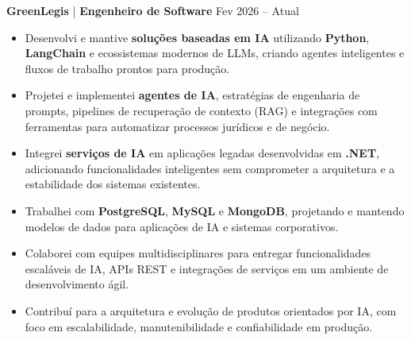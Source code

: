 \textbf{GreenLegis} | \textbf{Engenheiro de Software} \hfill Fev 2026 – Atual
\vspace{-3mm}
\begin{itemize} \itemsep -3pt
    \item Desenvolvi e mantive \textbf{soluções baseadas em IA} utilizando \textbf{Python}, \textbf{LangChain} e ecossistemas modernos de LLMs, criando agentes inteligentes e fluxos de trabalho prontos para produção.
    \item Projetei e implementei \textbf{agentes de IA}, estratégias de engenharia de prompts, pipelines de recuperação de contexto (RAG) e integrações com ferramentas para automatizar processos jurídicos e de negócio.
    \item Integrei \textbf{serviços de IA} em aplicações legadas desenvolvidas em \textbf{.NET}, adicionando funcionalidades inteligentes sem comprometer a arquitetura e a estabilidade dos sistemas existentes.
    \item Trabalhei com \textbf{PostgreSQL}, \textbf{MySQL} e \textbf{MongoDB}, projetando e mantendo modelos de dados para aplicações de IA e sistemas corporativos.
    \item Colaborei com equipes multidisciplinares para entregar funcionalidades escaláveis de IA, APIs REST e integrações de serviços em um ambiente de desenvolvimento ágil.
    \item Contribuí para a arquitetura e evolução de produtos orientados por IA, com foco em escalabilidade, manutenibilidade e confiabilidade em produção.
\end{itemize}

